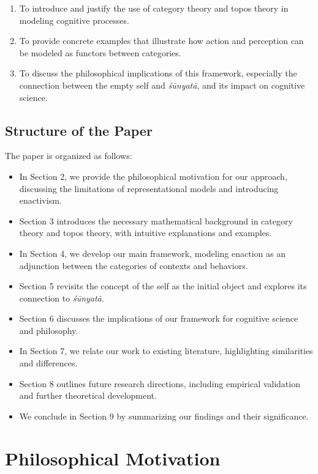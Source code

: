 \documentclass{article}
\begin{document}
\begin{enumerate} 
\item To introduce and justify the use of category theory and topos theory in modeling cognitive processes.
\item To provide concrete examples that illustrate how action and perception can be modeled as functors between categories.
\item To discuss the philosophical implications of this framework, especially the connection between the empty self and \emph{śūnyatā}, and its impact on cognitive science.

\end{enumerate}

\subsection{Structure of the Paper}

The paper is organized as follows:

\begin{itemize} 
\item In Section 2, we provide the philosophical motivation for our approach, discussing the limitations of representational models and introducing enactivism. 
\item Section 3 introduces the necessary mathematical background in category theory and topos theory, with intuitive explanations and examples. 
\item In Section 4, we develop our main framework, modeling enaction as an adjunction between the categories of contexts and behaviors. 
\item Section 5 revisits the concept of the self as the initial object and explores its connection to \emph{śūnyatā}. 
\item Section 6 discusses the implications of our framework for cognitive science and philosophy. 
\item In Section 7, we relate our work to existing literature, highlighting similarities and differences. 
\item Section 8 outlines future research directions, including empirical validation and further theoretical development. 
\item We conclude in Section 9 by summarizing our findings and their significance. 
\end{itemize}


\section{Philosophical Motivation}
\end{document}
